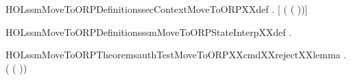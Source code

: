 \newcommand{\HOLssmMoveToORPDate}{10 June 2018}
\newcommand{\HOLssmMoveToORPTime}{18:23}
\begin{SaveVerbatim}{HOLssmMoveToORPDefinitionssecContextMoveToORPXXdef}
\HOLTokenTurnstile{} \HOLSymConst{\HOLTokenForall{}}.
       \HOLSymConst{=}
     [    ( ( ))]
\end{SaveVerbatim}
\newcommand{\HOLssmMoveToORPDefinitionssecContextMoveToORPXXdef}{\UseVerbatim{HOLssmMoveToORPDefinitionssecContextMoveToORPXXdef}}
\begin{SaveVerbatim}{HOLssmMoveToORPDefinitionsssmMoveToORPStateInterpXXdef}
\HOLTokenTurnstile{} \HOLSymConst{\HOLTokenForall{}}.   \HOLSymConst{=} 
\end{SaveVerbatim}
\newcommand{\HOLssmMoveToORPDefinitionsssmMoveToORPStateInterpXXdef}{\UseVerbatim{HOLssmMoveToORPDefinitionsssmMoveToORPStateInterpXXdef}}
\newcommand{\HOLssmMoveToORPDefinitions}{
\HOLDfnTag{ssmMoveToORP}{secContextMoveToORP_def}\HOLssmMoveToORPDefinitionssecContextMoveToORPXXdef
\HOLDfnTag{ssmMoveToORP}{ssmMoveToORPStateInterp_def}\HOLssmMoveToORPDefinitionsssmMoveToORPStateInterpXXdef
}
\begin{SaveVerbatim}{HOLssmMoveToORPTheoremsauthTestMoveToORPXXcmdXXrejectXXlemma}
\HOLTokenTurnstile{} \HOLSymConst{\HOLTokenForall{}}. \HOLSymConst{\HOLTokenNeg{}} ( ( ))
\end{SaveVerbatim}
\newcommand{\HOLssmMoveToORPTheoremsauthTestMoveToORPXXcmdXXrejectXXlemma}{\UseVerbatim{HOLssmMoveToORPTheoremsauthTestMoveToORPXXcmdXXrejectXXlemma}}

